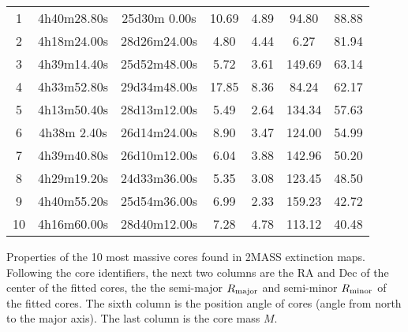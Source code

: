 \documentclass[12pt,preprint]{aastex}
\begin{document}
\begin{center}
\begin{longtable}[htb]{|c|c|c|c|c|c|c|}
   1 &  4h40m28.80s & 25d30m 0.00s & 10.69 &  4.89 &  94.80 & 88.88 \\
   2 &  4h18m24.00s & 28d26m24.00s &  4.80 &  4.44 &   6.27 & 81.94 \\
   3 &  4h39m14.40s & 25d52m48.00s &  5.72 &  3.61 & 149.69 & 63.14 \\
   4 &  4h33m52.80s & 29d34m48.00s & 17.85 &  8.36 &  84.24 & 62.17 \\
   5 &  4h13m50.40s & 28d13m12.00s &  5.49 &  2.64 & 134.34 & 57.63 \\
   6 &  4h38m 2.40s & 26d14m24.00s &  8.90 &  3.47 & 124.00 & 54.99 \\
   7 &  4h39m40.80s & 26d10m12.00s &  6.04 &  3.88 & 142.96 & 50.20 \\
   8 &  4h29m19.20s & 24d33m36.00s &  5.35 &  3.08 & 123.45 & 48.50 \\
   9 &  4h40m55.20s & 25d54m36.00s &  6.99 &  2.33 & 159.23 & 42.72 \\
  10 &  4h16m60.00s & 28d40m12.00s &  7.28 &  4.78 & 113.12 & 40.48 \\
\hline

\end{longtable}
{\footnotesize Properties of the 10 most massive cores found in 2MASS extinction maps. Following the core identifiers, the next two columns are the RA and Dec of the center of the fitted cores, the the semi-major $R_{\rm major}$ and semi-minor $R_{\rm minor}$ of the fitted cores. The sixth
column is the position angle of cores (angle from north to the major axis).  The last column
is the core mass $M$.}

\end{center}







{}

\end{document}
